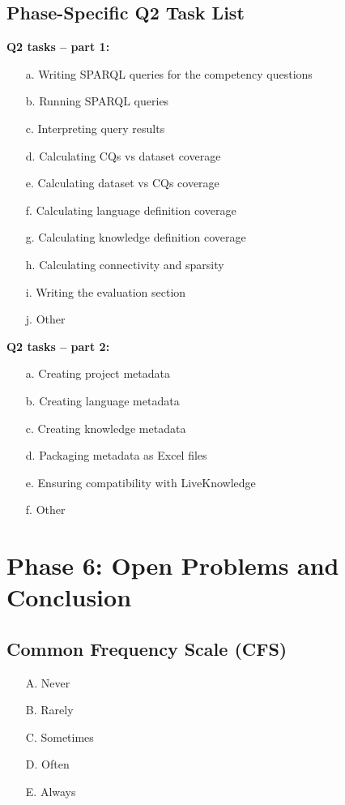 \subsection*{Phase-Specific Q2 Task List}
\textbf{Q2 tasks -- part 1:}
\begin{enumerate}
  \item[a.] Writing SPARQL queries for the competency questions
  \item[b.] Running SPARQL queries
  \item[c.] Interpreting query results
  \item[d.] Calculating CQs vs dataset coverage
  \item[e.] Calculating dataset vs CQs coverage
  \item[f.] Calculating language definition coverage
  \item[g.] Calculating knowledge definition coverage
  \item[h.] Calculating connectivity and sparsity
  \item[i.] Writing the evaluation section
  \item[j.] Other
\end{enumerate}

\textbf{Q2 tasks -- part 2:}
\begin{enumerate}
  \item[a.] Creating project metadata
  \item[b.] Creating language metadata
  \item[c.] Creating knowledge metadata
  \item[d.] Packaging metadata as Excel files
  \item[e.] Ensuring compatibility with LiveKnowledge
  \item[f.] Other
\end{enumerate}

\section*{Phase 6: Open Problems and Conclusion}

\subsection*{Common Frequency Scale (CFS)}
\begin{itemize}
  \item[A.] Never
  \item[B.] Rarely
  \item[C.] Sometimes
  \item[D.] Often
  \item[E.] Always
\end{itemize}

